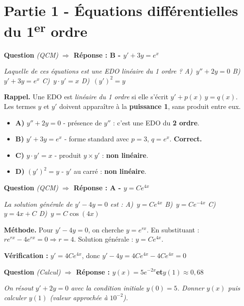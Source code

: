 \documentclass[11pt,a4paper]{article}
\newcounter{qnum}
\newcommand{\qtitre}[2]{%
  \stepcounter{qnum}%
  \medskip\noindent
  \textbf{\color{bleutexte}Question \theqnum}\enspace
  \textit{(#1)}\enspace
  \textcolor{vertok}{\textbf{$\Rightarrow$ Réponse : #2}}
  \par\smallskip
}
\newcommand{\qenonce}[1]{%
  \begin{mdframed}[backgroundcolor=grisbox, linewidth=0pt,
    innerleftmargin=8pt, innerrightmargin=8pt,
    innertopmargin=5pt, innerbottommargin=5pt,
    skipabove=2pt, skipbelow=4pt]
  \small\textit{#1}
  \end{mdframed}
}
\begin{document}
\section{Partie 1 - Équations différentielles du 1\textsuperscript{er} ordre}

\qtitre{QCM}{B - $y' + 3y = e^x$}
\qenonce{Laquelle de ces équations est une EDO linéaire du 1\ier{} ordre ?
\quad A)~$y'' + 2y = 0$ \quad B)~$y' + 3y = e^x$ \quad C)~$y \cdot y' = x$ \quad D)~$(y')^2 = y$}

\begin{methodebox}
\textbf{Rappel.} Une EDO est \emph{linéaire du 1\ier{} ordre} si elle s'écrit $y' + p(x)\,y = q(x)$.
Les termes $y$ et $y'$ doivent apparaître à la \textbf{puissance 1}, sans produit entre eux.
\end{methodebox}

\begin{itemize}[leftmargin=1.5em, itemsep=2pt]
  \item \textcolor{rougeerr}{\textbf{A)}} $y'' + 2y = 0$ - présence de $y''$ : c'est une EDO du \textbf{2\ieme{} ordre}.
  \item \textcolor{vertok}{\textbf{B)}} $y' + 3y = e^x$ - forme standard avec $p = 3$, $q = e^x$. \textbf{Correct.}
  \item \textcolor{rougeerr}{\textbf{C)}} $y \cdot y' = x$ - produit $y \times y'$ : \textbf{non linéaire}.
  \item \textcolor{rougeerr}{\textbf{D)}} $(y')^2 = y$ - $y'$ au carré : \textbf{non linéaire}.
\end{itemize}

\qtitre{QCM}{A - $y = Ce^{4x}$}
\qenonce{La solution générale de $y' - 4y = 0$ est :
\quad A)~$y = Ce^{4x}$ \quad B)~$y = Ce^{-4x}$ \quad C)~$y = 4x + C$ \quad D)~$y = C\cos(4x)$}

\begin{methodebox}
\textbf{Méthode.} Pour $y' - 4y = 0$, on cherche $y = e^{rx}$.
En substituant : $re^{rx} - 4e^{rx} = 0 \Rightarrow r = 4$.
Solution générale : $y = Ce^{4x}$.
\end{methodebox}

\textbf{Vérification :} $y' = 4Ce^{4x}$, donc $y' - 4y = 4Ce^{4x} - 4Ce^{4x} = 0$ \checkmark

\qtitre{Calcul}{$y(x) = 5e^{-2x}$\quad et\quad $y(1) \approx 0{,}68$}
\qenonce{On résout $y' + 2y = 0$ avec la condition initiale $y(0) = 5$. Donner $y(x)$ puis calculer $y(1)$ (valeur approchée à $10^{-2}$).}
\end{document}

